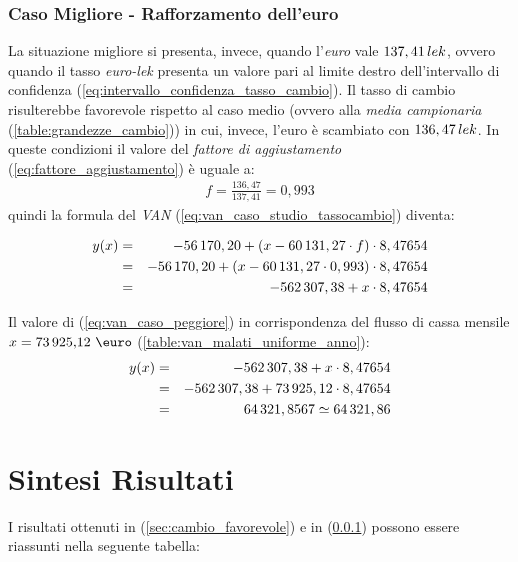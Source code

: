 \subsubsection[Caso Migliore - Rafforzamento dell'euro]{Caso Migliore - Rafforzamento dell'euro}
\label{sec:cambio_sfavorevole}
La situazione migliore si presenta, invece, quando l'\emph{euro} vale $137,41 \thinspace lek$, ovvero quando il tasso \emph{euro-lek} presenta un valore pari al limite destro dell'intervallo di confidenza (\ref{eq:intervallo_confidenza_tasso_cambio}). Il tasso di cambio risulterebbe favorevole rispetto al caso medio (ovvero alla \textit{media campionaria} (\ref{table:grandezze_cambio})) in cui, invece, l'euro è scambiato con $136,47 \thinspace lek$.\newline
In queste condizioni il valore del \textit{fattore di aggiustamento}  (\ref{eq:fattore_aggiustamento}) è uguale a:
\begin{equation}
\label{eq:fattore_aggiustamento_caso_peggiore}
\begin{split}
f = \frac{136,47}{137,41} = 0,993
\end{split}
\end{equation}
quindi la formula del \emph{\ac{VAN}} (\ref{eq:van_caso_studio_tassocambio}) diventa:

\begin{eqnarray}
\label{eq:van_caso_peggiore}
 		y(x) & = & -56\thinspace 170,20 + (x - 60\thinspace 131,27 \cdot f) \cdot 8,47654 \nonumber \\
 			 & = & -56\thinspace 170,20 + (x - 60\thinspace 131,27 \cdot 0,993) \cdot 8,47654 \nonumber \\
 			 & = & -562\thinspace 307,38 + x \cdot 8,47654
\end{eqnarray}

Il valore di (\ref{eq:van_caso_peggiore}) in corrispondenza del flusso di cassa mensile $ x = \mbox{73\thinspace 925,12 \euro}$ (\ref{table:van_malati_uniforme_anno}):
\begin{eqnarray}
\label{eq:van_flusso_cassa_malati_uniforme_caso_peggiore}
 		y(x) & = & -562\thinspace 307,38 + x \cdot 8,47654 \nonumber \\
 			 & = & -562\thinspace 307,38 + 73\thinspace 925,12 \cdot 8,47654 \nonumber \\
 			 & = & 64\thinspace 321,8567 \simeq 64\thinspace 321,86
\end{eqnarray}

\clearpage
\section[Sintesi Risultati]{Sintesi Risultati}
I risultati ottenuti in (\ref{sec:cambio_favorevole}) e in (\ref{sec:cambio_sfavorevole}) possono essere riassunti nella seguente tabella:

